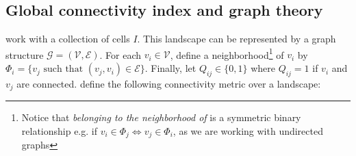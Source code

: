 


\subsection{Global connectivity index and graph theory}

\label{sec:connectivity}


\cite{minas_spatial_2014} work with a collection of cells $I$. This landscape can be represented by a graph structure $\mathcal{G}=(\mathcal{V}, \mathcal{E})$.
For each $v_i \in \mathcal{V}$, define a neighborhood\footnote{Notice that \textit{belonging to the neighborhood of} is a symmetric binary relationship e.g. if $v_i \in \Phi_j \iff v_j \in \Phi_i$, as we are working with undirected graphs} of $v_i$ by $\Phi_i = \{ v_j \text{ such that } (v_j, v_i) \in \mathcal{E} \}$. 
Finally, let $Q_{ij} \in \{0,1\}$ where $Q_{ij}=1$ if $v_i$ and $v_j$ are connected. \cite{minas_spatial_2014} define the following connectivity metric over a landscape: 

